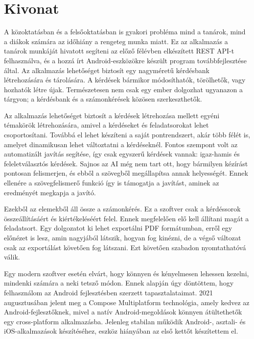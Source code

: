 \setcounter{page}{1}

\selecthungarian

\chapter*{Kivonat}

A közoktatásban és a felsőoktatásban is gyakori probléma mind a tanárok, mind a diákok számára az időhiány a rengeteg munka miatt.
Ez az alkalmazás a tanárok munkáját hivatott segíteni az előző félévben elkészített REST API-t felhasználva, és a hozzá írt Android-eszközökre készült program továbbfejlesztése által.
Az alkalmazás lehetőséget biztosít egy nagyméretű kérdésbank létrehozására és tárolására.
A kérdések bármikor módosíthatók, törölhetők, vagy hozhatók létre újak.
Természetesen nem csak egy ember dolgozhat ugyanazon a tárgyon; a kérdésbank és a számonkérések közösen szerkeszthetők.

Az alkalmazás lehetőséget biztosít a kérdések létrehozása mellett egyéni témakörök létrehozására, amivel a kérdéseket és feladatsorokat lehet csoportosítani.
Továbbá el lehet készíteni a saját pontrendszert, akár több félét is, amelyet dinamikusan lehet változtatni a kérdéseknél.
Fontos szempont volt az automatizált javítás segítése, így csak egyszerű kérdések vannak: igaz-hamis és feleletválasztós kérdések.
Sajnos az AI még nem tart ott, hogy bármilyen kézírást pontosan felismerjen, és ebből a szövegből megállapítsa annak helyességét. Ennek ellenére a szövegfelismerő funkció így is támogatja a javítást, aminek az eredményét megkapja a javító.

Ezekből az elemekből áll össze a számonkérés.
Ez a szoftver csak a kérdéssorok összeállításáért és kiértékeléséért felel. 
Ennek megfelelően elő kell állítani magát a feladatsort. 
Egy dolgozatot ki lehet exportálni PDF formátumban, erről egy előnézet is lesz, amin nagyjából látszik, hogyan fog kinézni, de a végső változat csak az exportálást követően fog látszani. 
Ezt követően szabadon nyomtathatóvá válik.

Egy modern szoftver esetén elvárt, hogy könnyen és kényelmesen lehessen kezelni, mindenki számára a neki tetsző módon. 
Ennek alapján úgy döntöttem, hogy felhasználom az Android fejlesztésben szerzett tapasztalataimat. 
2021 augusztusában jelent meg a Compose Multiplatform technológia, amely kedvez az Android-fejlesztőknek, mivel a natív Android-megoldások könnyen átültethetők egy cross-platform alkalmazásba. 
Jelenleg stabilan működik Android-, asztali- és iOS-alkalmazások készítéséhez, eszköz hiányában az első kettőt készítettem el.



